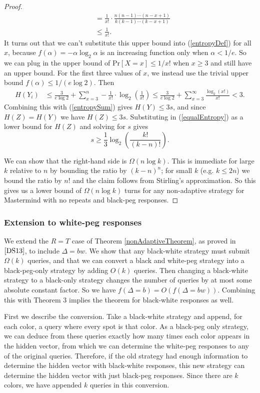 \documentclass[12pt, a4paper]{article}
\begin{document}
\begin{proof}
\begin{align*}
		&= \frac{1}{x!}\cdot\frac{n(n-1)\cdots(n-x+1)}{k(k-1)\cdots(k-x+1)}\\
		&\leq \frac{1}{x!}.
	\end{align*}
	It turns out that we can't substitute this upper bound into  (\ref{entropyDef}) for all $x$, because $f(\alpha)=-\alpha\log_2\alpha$ is an increasing function only when $\alpha<1/e$. So we can plug in the upper bound of $\text{Pr}[X=x]\le 1/x!$ when $x\ge 3$ and still have an upper bound. For the first three values of $x$, we instead use the trivial upper bound $f(\alpha)\le 1/(e\log 2)$. Then
	\begin{align*}
		H(Y_i) &\leq \frac{3}{e\log 2}+\sum_{x=3}^n-\frac{1}{x!}\cdot\log_2\left(\frac{1}{x!}\right)
		\le \frac{3}{e\log 2}+\sum_{x=3}^\infty \frac{\log_2(x!)}{x!}
		<3.
	\end{align*}
	Combining this with (\ref{entropySum}) gives $H(Y) \leq 3s$, and since $H(Z) = H(Y)$ we have $H(Z) \leq 3s$. Substituting in (\ref{equalEntropy}) as a lower bound for $H(Z)$ and solving for $s$ gives
	\begin{equation*}
	s \geq \frac{1}{3}\log_2\left(\frac{k!}{(k-n)!}\right).
	\end{equation*}
	
	We can show that the right-hand side is $\Omega(n\log k)$. This is immediate for large $k$ relative to $n$ by bounding the ratio by $(k-n)^n$; for small $k$ (e.g. $k \leq 2n$) we bound the ratio by $n!$ and the claim follows from Stirling's approximation. So this gives us a lower bound of $\Omega(n \log k)$ turns for any non-adaptive strategy for Mastermind with no repeats and black-peg responses.
\end{proof}
\subsubsection{Extension to white-peg responses}
We extend the $R=T$ case of Theorem \ref{nonAdaptiveTheorem}, as proved in $\cite{DS13}$, to include $\Delta = bw$. We show that any black-white strategy must submit $\Omega(k)$ queries, and that we can convert a black and white-peg strategy into a black-peg-only strategy by adding $O(k)$ queries. 
Then changing a black-white strategy to a black-only strategy changes the number of queries by at most some absolute constant factor. So we have $f(\Delta = b) = O(f(\Delta = bw))$. Combining this with Theorem 3 implies the theorem for black-white responses as well.

First we describe the conversion. Take a black-white strategy and append, for each color, a query where every spot is that color. As a black-peg only strategy, we can deduce from these queries exactly how many times each color appears in the hidden vector, from which we can determine the white-peg responses to any of the original queries. Therefore, if the old strategy had enough information to determine the hidden vector with black-white responses, this new strategy can determine the hidden vector with just black-peg responses. Since there are $k$ colors, we have appended $k$ queries in this conversion. 
\end{document}
